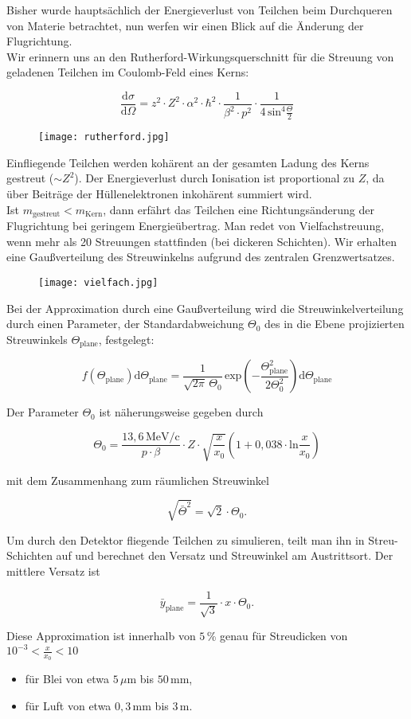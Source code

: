 Bisher wurde hauptsächlich der Energieverlust von Teilchen beim Durchqueren von Materie betrachtet,
nun werfen wir einen Blick auf die Änderung der Flugrichtung.
\\
Wir erinnern uns an den Rutherford-Wirkungsquerschnitt für die Streuung von geladenen Teilchen im
Coulomb-Feld eines Kerns:

\[ \frac{\mathrm{d}\sigma}{\mathrm{d}\Omega} = z^2\cdot Z^2\cdot\alpha^2\cdot\hbar^2\cdot
\frac{1}{\beta^2\cdot p^2}\cdot
\frac{1}{4\,\text{sin}^4\frac{\Theta}{2}}
\]

\begin{figure}[H]
	\centering
	\texttt{[image: rutherford.jpg]}
\end{figure}

Einfliegende Teilchen werden kohärent an der gesamten Ladung des Kerns gestreut ($\sim Z^2$). Der
Energieverlust durch Ionisation ist proportional zu $Z$, da über Beiträge der Hüllenelektronen
inkohärent summiert wird.
\\ 
Ist $m_\text{gestreut} < m_\text{Kern}$, dann erfährt das Teilchen eine Richtungsänderung der
Flugrichtung bei geringem Energieübertrag. Man redet von Vielfachstreuung, wenn mehr als 20
Streuungen stattfinden (bei dickeren Schichten). Wir erhalten eine Gaußverteilung des Streuwinkelns
aufgrund des zentralen Grenzwertsatzes.

\begin{figure}[H]
	\centering
	\texttt{[image: vielfach.jpg]}
\end{figure}

Bei der Approximation durch eine Gaußverteilung wird die Streuwinkelverteilung durch einen
Parameter, der Standardabweichung $\Theta_0$ des in die Ebene projizierten Streuwinkels
$\Theta_\text{plane}$, festgelegt:

\[f(\Theta_\text{plane}) \mathrm{d}\Theta_\text{plane} =
\frac{1}{\sqrt{2\pi}\,\Theta_0} \,\text{exp}\left(-\frac{\Theta_\text{plane}^2}{2\Theta_0^2} \right)
\mathrm{d}\Theta_\text{plane}\]

Der Parameter $\Theta_0$ ist näherungsweise gegeben durch

\[\Theta_0 = \frac{13{,}6\,\text{MeV/c}}{p\cdot\beta} \cdot Z\cdot
\sqrt{\frac{x}{x_0}}\left(1+0{,}038\cdot\text{ln}\frac{x}{x_0} \right)   \]

mit dem Zusammenhang zum räumlichen Streuwinkel

\[\sqrt{\bar{\Theta}^2} = \sqrt{2}\cdot\Theta_0.  \]

Um durch den Detektor fliegende Teilchen zu simulieren, teilt man ihn in Streu-Schichten auf und
berechnet den Versatz und Streuwinkel am Austrittsort. Der mittlere Versatz ist

\[ \bar{y}_\text{plane} = \frac{1}{\sqrt{3}}\cdot x \cdot \Theta_0. \]

Diese Approximation ist innerhalb von $5\,$\% genau für Streudicken von $10^{-3}<\frac{x}{x_0}<10$
\begin{itemize}
  \item für Blei von etwa $5\,\mu$m bis $50\,$mm,
  \item für Luft von etwa $0{,}3\,$mm bis $3\,$m.
\end{itemize}


